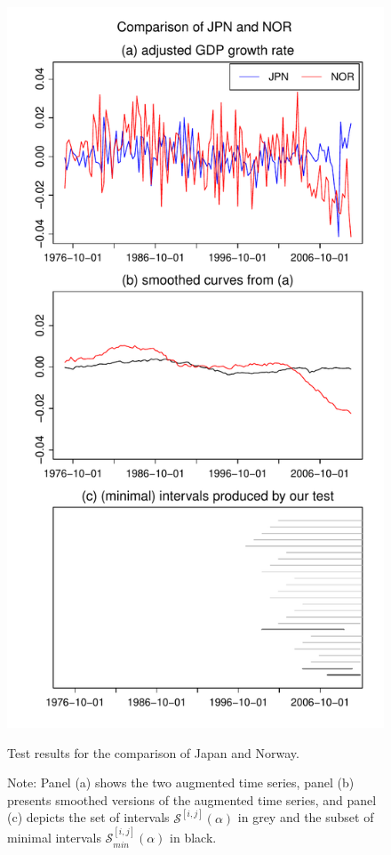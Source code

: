 \documentclass[a4paper,12pt]{article}
\begin{document}
\begin{figure}[p!]
\begin{center}
\begin{minipage}[t]{0.49\textwidth}
\includegraphics[width=\textwidth]{output/plots/gdp/JPN_vs_NOR}
\caption{Test results for the comparison of Japan and Norway.}\label{fig:Japan:Norway}
\end{minipage}
\end{center}
\caption*{Note: Panel (a) shows the two augmented time series, panel (b) presents smoothed versions of the augmented time series, and panel (c) depicts the set of intervals $\mathcal{S}^{[i, j]}(\alpha)$ in grey and the subset of minimal intervals $\mathcal{S}^{[i, j]}_{min}(\alpha)$ in black.}
\end{figure}
\end{document}
